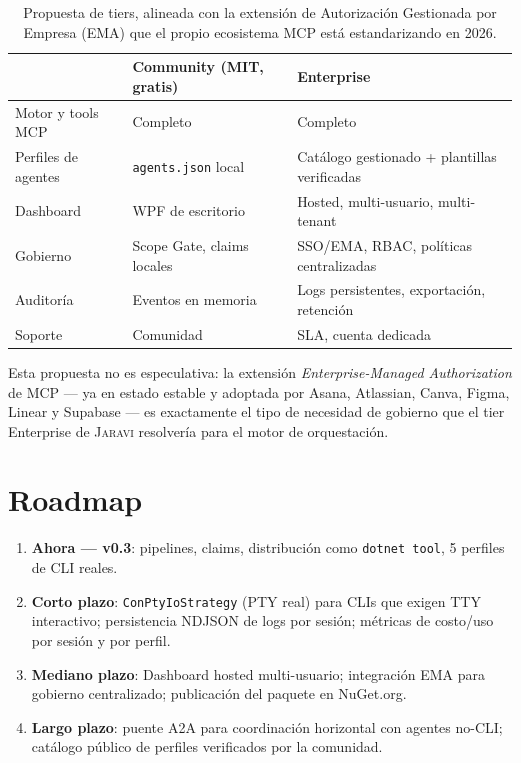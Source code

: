 \documentclass[11pt]{article}
\newcommand{\jaravi}{\textsc{Jaravi}\xspace}
\begin{document}
\begin{table}[h]
\centering
\small
\begin{tabularx}{\textwidth}{l X X}
\toprule
& \textbf{Community (MIT, gratis)} & \textbf{Enterprise} \\
\midrule
Motor y tools MCP & Completo & Completo \\
Perfiles de agentes & \texttt{agents.json} local & Catálogo gestionado + plantillas verificadas \\
Dashboard & WPF de escritorio & Hosted, multi-usuario, multi-tenant \\
Gobierno & Scope Gate, claims locales & SSO/EMA, RBAC, políticas centralizadas \\
Auditoría & Eventos en memoria & Logs persistentes, exportación, retención \\
Soporte & Comunidad & SLA, cuenta dedicada \\
\bottomrule
\end{tabularx}
\caption{Propuesta de tiers, alineada con la extensión de Autorización Gestionada por Empresa (EMA) que el propio ecosistema MCP está estandarizando en 2026.}
\end{table}

Esta propuesta no es especulativa: la extensión \emph{Enterprise-Managed Authorization} de MCP --- ya en estado estable y adoptada por Asana, Atlassian, Canva, Figma, Linear y Supabase --- es exactamente el tipo de necesidad de gobierno que el tier Enterprise de \jaravi resolvería para el motor de orquestación.

\section{Roadmap}

\begin{enumerate}
\item \textbf{Ahora --- v0.3}: pipelines, claims, distribución como \texttt{dotnet tool}, 5 perfiles de CLI reales.
\item \textbf{Corto plazo}: \texttt{ConPtyIoStrategy} (PTY real) para CLIs que exigen TTY interactivo; persistencia NDJSON de logs por sesión; métricas de costo/uso por sesión y por perfil.
\item \textbf{Mediano plazo}: Dashboard hosted multi-usuario; integración EMA para gobierno centralizado; publicación del paquete en NuGet.org.
\item \textbf{Largo plazo}: puente A2A para coordinación horizontal con agentes no-CLI; catálogo público de perfiles verificados por la comunidad.
\end{enumerate}
\end{document}
